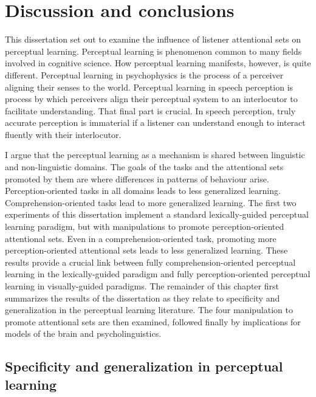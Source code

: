 
\chapter{Discussion and conclusions}
\label{chap:conclusion}

This dissertation set out to examine the influence of listener attentional sets on perceptual learning.
Perceptual learning is phenomenon common to many fields involved in cognitive science.
How perceptual learning manifests, however, is quite different.
Perceptual learning in psychophysics is the process of a perceiver aligning their senses to the world.
Perceptual learning in speech perception is process by which perceivers align their perceptual system to an interlocutor to facilitate understanding.
That final part is crucial.
In speech perception, truly accurate perception is immaterial if a listener can understand enough to interact fluently with their interlocutor.

I argue that the perceptual learning as a mechanism is shared between linguistic and non-linguistic domains.
The goals of the tasks and the attentional sets promoted by them are where differences in patterns of behaviour arise.
Perception-oriented tasks in all domains leads to less generalized learning.
Comprehension-oriented tasks lead to more generalized learning.
The first two experiments of this dissertation implement a standard lexically-guided perceptual learning paradigm, but with manipulations to promote perception-oriented attentional sets.
Even in a comprehension-oriented task, promoting more perception-oriented attentional sets leads to less generalized learning.
These results provide a crucial link between fully comprehension-oriented perceptual learning in the lexically-guided paradigm and fully perception-oriented perceptual learning in visually-guided paradigms.
The remainder of this chapter first summarizes the results of the dissertation as they relate to specificity and generalization in the perceptual learning literature.
The four manipulation to promote attentional sets are then examined, followed finally by implications for models of the brain and psycholinguistics.

\section{Specificity and generalization in perceptual learning}

